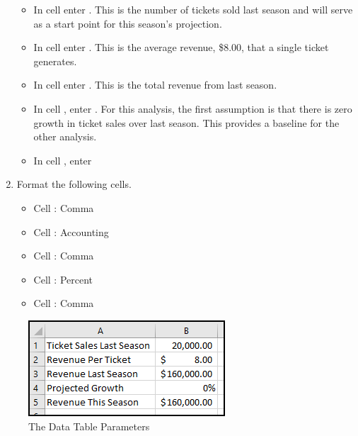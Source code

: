 \begin{enumerate}
	\begin{itemize}
		\item In cell  enter . This is the number of tickets sold last season and will serve as a start point for this season's projection.
		\item In cell  enter . This is the average revenue, \$$ 8.00 $, that a single ticket generates.
		\item In cell  enter . This is the total revenue from last season. 
		\item In cell , enter . For this analysis, the first assumption is that there is zero growth in ticket sales over last season. This provides a baseline for the other analysis.
		\item In cell , enter 
	\end{itemize}

	\item Format the following cells.

	\begin{itemize}
		\item Cell : Comma
		\item Cell : Accounting
		\item Cell : Comma
		\item Cell : Percent
		\item Cell : Comma
	\end{itemize}

\end{enumerate}

\begin{figure}[H]
	\centering
	\includegraphics[width=\maxwidth{.65\linewidth}]{gfx/ch08_fig40}
	\caption{The Data Table Parameters}
	\label{08:fig40}
\end{figure}

